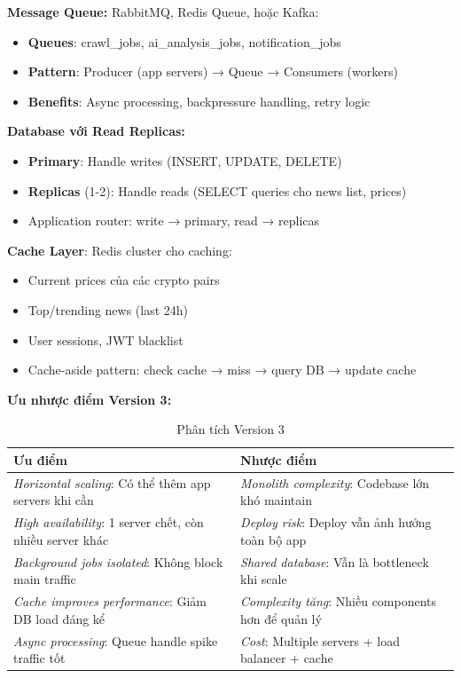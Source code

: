 \noindent\textbf{Message Queue:}
RabbitMQ, Redis Queue, hoặc Kafka:
\begin{itemize}
    \item \textbf{Queues}: crawl\_jobs, ai\_analysis\_jobs, notification\_jobs
    \item \textbf{Pattern}: Producer (app servers) → Queue → Consumers (workers)
    \item \textbf{Benefits}: Async processing, backpressure handling, retry logic
\end{itemize}

\noindent\textbf{Database với Read Replicas:}
\begin{itemize}
    \item \textbf{Primary}: Handle writes (INSERT, UPDATE, DELETE)
    \item \textbf{Replicas} (1-2): Handle reads (SELECT queries cho news list, prices)
    \item Application router: write → primary, read → replicas
\end{itemize}

\textbf{Cache Layer}:
Redis cluster cho caching:
\begin{itemize}
    \item Current prices của các crypto pairs
    \item Top/trending news (last 24h)
    \item User sessions, JWT blacklist
    \item Cache-aside pattern: check cache → miss → query DB → update cache
\end{itemize}

\noindent\textbf{Ưu nhược điểm Version 3:}

\begin{table}[H]
\centering
\caption{Phân tích Version 3}
\begin{tabular}{|p{6.5cm}|p{6.5cm}|}
\hline
\textbf{Ưu điểm} & \textbf{Nhược điểm} \\
\hline
\textit{Horizontal scaling}: Có thể thêm app servers khi cần & \textit{Monolith complexity}: Codebase lớn khó maintain \\
\hline
\textit{High availability}: 1 server chết, còn nhiều server khác & \textit{Deploy risk}: Deploy vẫn ảnh hưởng toàn bộ app \\
\hline
\textit{Background jobs isolated}: Không block main traffic & \textit{Shared database}: Vẫn là bottleneck khi scale \\
\hline
\textit{Cache improves performance}: Giảm DB load đáng kể & \textit{Complexity tăng}: Nhiều components hơn để quản lý \\
\hline
\textit{Async processing}: Queue handle spike traffic tốt & \textit{Cost}: Multiple servers + load balancer + cache \\
\hline
\end{tabular}
\end{table}

